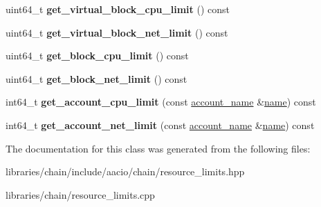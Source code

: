 \begin{DoxyCompactItemize}
\item 
\mbox{\label{classaacio_1_1chain_1_1resource__limits_1_1resource__limits__manager_a7b298ad41adbcb85274bb575b360bd7c}} 
uint64\+\_\+t {\bfseries get\+\_\+virtual\+\_\+block\+\_\+cpu\+\_\+limit} () const
\item 
\mbox{\label{classaacio_1_1chain_1_1resource__limits_1_1resource__limits__manager_abb8919bfc3154c7d05258ecfb6546319}} 
uint64\+\_\+t {\bfseries get\+\_\+virtual\+\_\+block\+\_\+net\+\_\+limit} () const
\item 
\mbox{\label{classaacio_1_1chain_1_1resource__limits_1_1resource__limits__manager_af73bbcb856a5011eb9dc30c241c9ad34}} 
uint64\+\_\+t {\bfseries get\+\_\+block\+\_\+cpu\+\_\+limit} () const
\item 
\mbox{\label{classaacio_1_1chain_1_1resource__limits_1_1resource__limits__manager_a5f5e61ab49bdd848abbbbb1926a649f9}} 
uint64\+\_\+t {\bfseries get\+\_\+block\+\_\+net\+\_\+limit} () const
\item 
\mbox{\label{classaacio_1_1chain_1_1resource__limits_1_1resource__limits__manager_ab4dabf8120d52c0d6b26b131ccdda40f}} 
int64\+\_\+t {\bfseries get\+\_\+account\+\_\+cpu\+\_\+limit} (const \mbox{\hyperlink{structaacio_1_1chain_1_1name}{account\+\_\+name}} \&\mbox{\hyperlink{structaacio_1_1chain_1_1name}{name}}) const
\item 
\mbox{\label{classaacio_1_1chain_1_1resource__limits_1_1resource__limits__manager_a05a37fad54026485779be1e2cfccc83d}} 
int64\+\_\+t {\bfseries get\+\_\+account\+\_\+net\+\_\+limit} (const \mbox{\hyperlink{structaacio_1_1chain_1_1name}{account\+\_\+name}} \&\mbox{\hyperlink{structaacio_1_1chain_1_1name}{name}}) const
\end{DoxyCompactItemize}


The documentation for this class was generated from the following files\+:\begin{DoxyCompactItemize}
\item 
libraries/chain/include/aacio/chain/resource\+\_\+limits.\+hpp\item 
libraries/chain/resource\+\_\+limits.\+cpp\end{DoxyCompactItemize}

